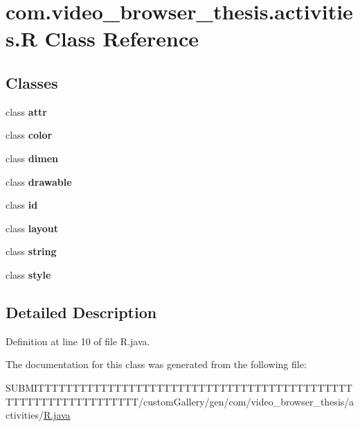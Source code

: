 \hypertarget{classcom_1_1video__browser__thesis_1_1activities_1_1_r}{\section{com.\-video\-\_\-browser\-\_\-thesis.\-activities.\-R Class Reference}
\label{classcom_1_1video__browser__thesis_1_1activities_1_1_r}
}
\subsection*{Classes}
\begin{DoxyCompactItemize}
\item 
class {\bfseries attr}
\item 
class {\bfseries color}
\item 
class {\bfseries dimen}
\item 
class {\bfseries drawable}
\item 
class {\bfseries id}
\item 
class {\bfseries layout}
\item 
class {\bfseries string}
\item 
class {\bfseries style}
\end{DoxyCompactItemize}


\subsection{Detailed Description}


Definition at line 10 of file R.\-java.



The documentation for this class was generated from the following file\-:\begin{DoxyCompactItemize}
\item 
S\-U\-B\-M\-I\-T\-T\-T\-T\-T\-T\-T\-T\-T\-T\-T\-T\-T\-T\-T\-T\-T\-T\-T\-T\-T\-T\-T\-T\-T\-T\-T\-T\-T\-T\-T\-T\-T\-T\-T\-T\-T\-T\-T\-T\-T\-T\-T\-T\-T\-T\-T\-T\-T\-T\-T\-T\-T\-T\-T\-T\-T\-T\-T\-T\-T\-T\-T\-T/custom\-Gallery/gen/com/video\-\_\-browser\-\_\-thesis/activities/\hyperlink{_r_8java}{R.\-java}\end{DoxyCompactItemize}
